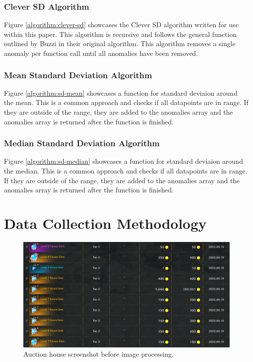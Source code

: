 \documentclass[journal]{IEEEtran}
\begin{document}
\subsubsection{Clever SD Algorithm}
Figure \ref{algorithm:clever-sd} showcases the Clever SD algorithm written for use within this paper. This algorithm is recursive and follows the general function outlined by Buzzi\cite{Buzzi2011} in their original algorithm. This algorithm removes a single anomaly per function call until all anomalies have been removed.

\subsubsection{Mean Standard Deviation Algorithm}
Figure \ref{algorithm:sd-mean} showcases a function for standard deviaion around the mean. This is a common approach and checks if all datapoints are in range. If they are outside of the range, they are added to the anomalies array and the anomalies array is returned after the function is finished.

\subsubsection{Median Standard Deviation Algorithm}
Figure \ref{algorithm:sd-median} showcases a function for standard deviaion around the median. This is a common approach and checks if all datapoints are in range. If they are outside of the range, they are added to the anomalies array and the anomalies array is returned after the function is finished.

\section{Data Collection Methodology}
\begin{figure}[!htbp]
    \centering
    \includegraphics[width=12cm]{auction-house-before.png}
    \caption{Auction house screenshot before image processing.}
    \label{figure:auction-house-before}
\end{figure}
\end{document}
